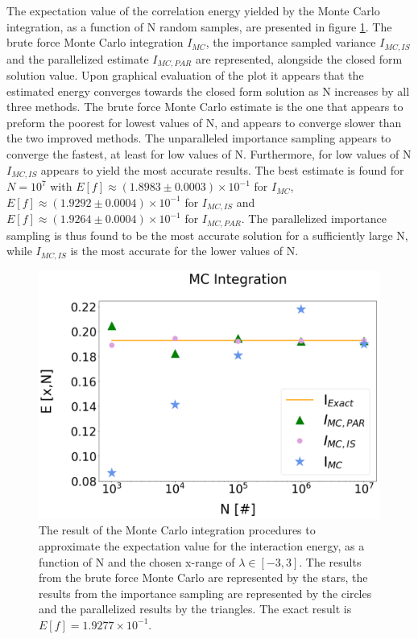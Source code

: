 \documentclass[%
reprint,nofootinbib,
amsmath,amssymb,
aps,
]{revtex4-1}
\begin{document}
The expectation value of the correlation energy yielded by the Monte Carlo integration, as a function of N random samples, are presented in figure \ref{mc}. The brute force Monte Carlo integration $I_{MC}$, the importance sampled variance $I_{MC,IS}$ and the parallelized estimate $I_{MC, PAR}$ are represented, alongside the closed form solution value. Upon graphical evaluation of the plot it appears that the estimated energy converges towards the closed form solution as N increases by all three methods. The brute force Monte Carlo estimate is the one that appears to preform the poorest for lowest values of N, and appears to converge slower than the two improved methods. The unparalleled importance sampling appears to converge the fastest, at least for low values of N. Furthermore, for low values of N $I_{MC,IS}$ appears to yield the most accurate results. The best estimate is found for $N = 10^7$ with $E[f]\approx (1.8983 \pm 0.0003)\times 10^{-1}$ for $I_{MC}$,  $E[f]\approx (1.9292 \pm 0.0004)\times 10^{-1}$ for $I_{MC,IS}$ and $E[f]\approx (1.9264 \pm 0.0004)\times 10^{-1}$ for $I_{MC,PAR}$. The parallelized importance sampling is thus found to be the most accurate solution for a sufficiently large N, while $I_{MC,IS}$ is the most accurate for the lower values of N. 
\begin{figure}[H]
	\includegraphics[width=\columnwidth]{MC_integration.png}
	\caption{\label{mc} The result of the Monte Carlo integration procedures to approximate the expectation value for the interaction energy, as a function of N and the chosen x-range of $\lambda \in[-3,3]$. The results from the brute force Monte Carlo are represented by the stars, the results from the importance sampling are represented by the circles and the parallelized results by the triangles. The exact result is $E[f] = 1.9277\times 10^{-1}$. }
\end{figure}
\end{document}
